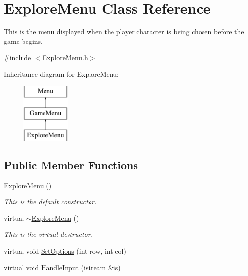\hypertarget{classExploreMenu}{\section{Explore\-Menu Class Reference}
\label{classExploreMenu}
}


This is the menu displayed when the player character is being chosen before the game begins.  




{\ttfamily \#include $<$Explore\-Menu.\-h$>$}

Inheritance diagram for Explore\-Menu\-:\begin{figure}[H]
\begin{center}
\leavevmode
\includegraphics[height=3.000000cm]{classExploreMenu}
\end{center}
\end{figure}
\subsection*{Public Member Functions}
\begin{DoxyCompactItemize}
\item 
\hypertarget{classExploreMenu_ac05a4f8e2972f1617a702e04677f241b}{\hyperlink{classExploreMenu_ac05a4f8e2972f1617a702e04677f241b}{Explore\-Menu} ()}\label{classExploreMenu_ac05a4f8e2972f1617a702e04677f241b}

\begin{DoxyCompactList}\small\item\em This is the default constructor. \end{DoxyCompactList}\item 
\hypertarget{classExploreMenu_ade9d89c5b19679f01b73120120022e68}{virtual \hyperlink{classExploreMenu_ade9d89c5b19679f01b73120120022e68}{$\sim$\-Explore\-Menu} ()}\label{classExploreMenu_ade9d89c5b19679f01b73120120022e68}

\begin{DoxyCompactList}\small\item\em This is the virtual destructor. \end{DoxyCompactList}\item 
virtual void \hyperlink{classExploreMenu_ab31bbcb898e635120ec88eb296fa1825}{Set\-Options} (int row, int col)
\item 
virtual void \hyperlink{classExploreMenu_aa75a9fcba679d683855d3188f1fc3505}{Handle\-Input} (istream \&is)
\end{DoxyCompactItemize}
